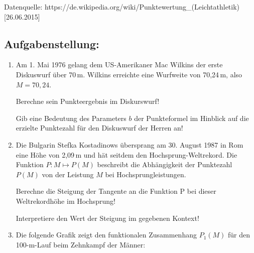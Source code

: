 \begin{langesbeispiel}
\begin{scriptsize}Datenquelle: https://de.wikipedia.org/wiki/Punktewertung\_(Leichtathletik) [26.06.2015]\end{scriptsize}

\subsection{Aufgabenstellung:}
\begin{enumerate}
	\item Am 1. Mai 1976 gelang dem US-Amerikaner Mac Wilkins der erste Diskuswurf über 70\,m. Wilkins erreichte eine Wurfweite von 70,24\,m, also $M=70,24$.
	
	 Berechne sein Punkteergebnis im Diskurswurf!
	
	Gib eine Bedeutung des Parameters $b$ der Punkteformel im Hinblick auf die erzielte Punktezahl für den Diskuswurf der Herren an!
	
\item Die Bulgarin Stefka Kostadinows übersprang am 30. August 1987 in Rom eine Höhe von 2,09\,m und hät seitdem den Hochsprung-Weltrekord. Die Funktion $P:M\mapsto P(M)$ beschreibt die Abhängigkeit der Punktezahl $P(M)$ von der Leistung $M$ bei Hochsprungleistungen.

Berechne die Steigung der Tangente an die Funktion P bei dieser Weltrekordhöhe im Hochsprung! 
 
Interpretiere den Wert der Steigung im gegebenen Kontext!

\item Die folgende Grafik zeigt den funktionalen Zusammenhang $P_1(M)$ für den 100-m-Lauf beim Zehnkampf der Männer: 

\begin{center}
\end{center}



\end{enumerate}
\end{langesbeispiel}
